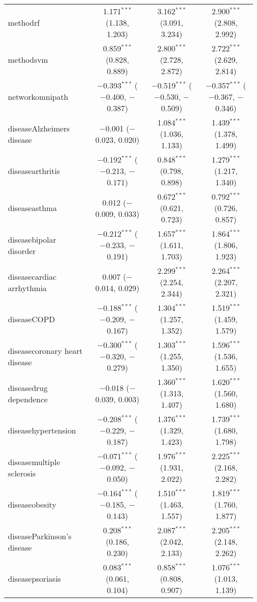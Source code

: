 \begin{table}[!htbp]
\begin{tabular}{@{\extracolsep{5pt}}lccc}
  methodrf & 1.171$^{***}$ (1.138, 1.203) & 3.162$^{***}$ (3.091, 3.234) & 2.900$^{***}$ (2.808, 2.992) \\ 
  methodsvm & 0.859$^{***}$ (0.828, 0.889) & 2.800$^{***}$ (2.728, 2.872) & 2.722$^{***}$ (2.629, 2.814) \\ 
  networkomnipath & $-$0.393$^{***}$ ($-$0.400, $-$0.387) & $-$0.519$^{***}$ ($-$0.530, $-$0.509) & $-$0.357$^{***}$ ($-$0.367, $-$0.346) \\ 
  diseaseAlzheimers disease & $-$0.001 ($-$0.023, 0.020) & 1.084$^{***}$ (1.036, 1.133) & 1.439$^{***}$ (1.378, 1.499) \\ 
  diseasearthritis & $-$0.192$^{***}$ ($-$0.213, $-$0.171) & 0.848$^{***}$ (0.798, 0.898) & 1.279$^{***}$ (1.217, 1.340) \\ 
  diseaseasthma & 0.012 ($-$0.009, 0.033) & 0.672$^{***}$ (0.621, 0.723) & 0.792$^{***}$ (0.726, 0.857) \\ 
  diseasebipolar disorder & $-$0.212$^{***}$ ($-$0.233, $-$0.191) & 1.657$^{***}$ (1.611, 1.703) & 1.864$^{***}$ (1.806, 1.923) \\ 
  diseasecardiac arrhythmia & 0.007 ($-$0.014, 0.029) & 2.299$^{***}$ (2.254, 2.344) & 2.264$^{***}$ (2.207, 2.321) \\ 
  diseaseCOPD & $-$0.188$^{***}$ ($-$0.209, $-$0.167) & 1.304$^{***}$ (1.257, 1.352) & 1.519$^{***}$ (1.459, 1.579) \\ 
  diseasecoronary heart disease & $-$0.300$^{***}$ ($-$0.320, $-$0.279) & 1.303$^{***}$ (1.255, 1.350) & 1.596$^{***}$ (1.536, 1.655) \\ 
  diseasedrug dependence & $-$0.018 ($-$0.039, 0.003) & 1.360$^{***}$ (1.313, 1.407) & 1.620$^{***}$ (1.560, 1.680) \\ 
  diseasehypertension & $-$0.208$^{***}$ ($-$0.229, $-$0.187) & 1.376$^{***}$ (1.329, 1.423) & 1.739$^{***}$ (1.680, 1.798) \\ 
  diseasemultiple sclerosis & $-$0.071$^{***}$ ($-$0.092, $-$0.050) & 1.976$^{***}$ (1.931, 2.022) & 2.225$^{***}$ (2.168, 2.282) \\ 
  diseaseobesity & $-$0.164$^{***}$ ($-$0.185, $-$0.143) & 1.510$^{***}$ (1.463, 1.557) & 1.819$^{***}$ (1.760, 1.877) \\ 
  diseaseParkinson's disease & 0.208$^{***}$ (0.186, 0.230) & 2.087$^{***}$ (2.042, 2.133) & 2.205$^{***}$ (2.148, 2.262) \\ 
  diseasepsoriasis & 0.083$^{***}$ (0.061, 0.104) & 0.858$^{***}$ (0.808, 0.907) & 1.076$^{***}$ (1.013, 1.139) \\ 

\end{tabular}
\end{table}
